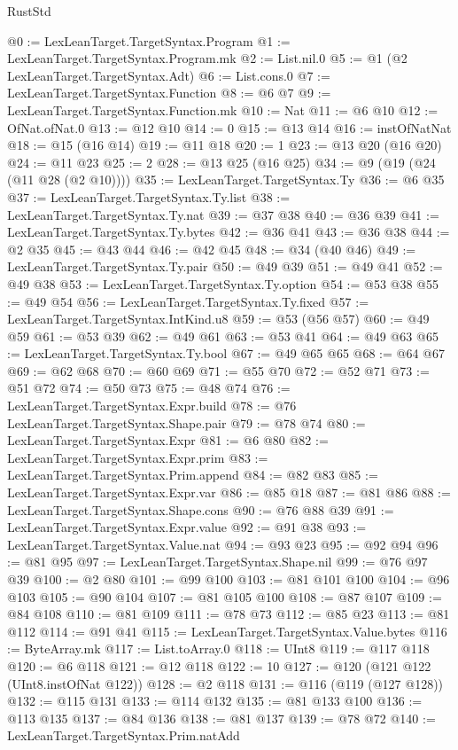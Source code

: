 \begin{lexlean}{RustStd}
\begin{coremodule}
@0 := LexLeanTarget.TargetSyntax.Program
@1 := LexLeanTarget.TargetSyntax.Program.mk
@2 := List.nil.{0}
@5 := @1 (@2 LexLeanTarget.TargetSyntax.Adt)
@6 := List.cons.{0}
@7 := LexLeanTarget.TargetSyntax.Function
@8 := @6 @7
@9 := LexLeanTarget.TargetSyntax.Function.mk
@10 := Nat
@11 := @6 @10
@12 := OfNat.ofNat.{0}
@13 := @12 @10
@14 := 0
@15 := @13 @14
@16 := instOfNatNat
@18 := @15 (@16 @14)
@19 := @11 @18
@20 := 1
@23 := @13 @20 (@16 @20)
@24 := @11 @23
@25 := 2
@28 := @13 @25 (@16 @25)
@34 := @9 (@19 (@24 (@11 @28 (@2 @10))))
@35 := LexLeanTarget.TargetSyntax.Ty
@36 := @6 @35
@37 := LexLeanTarget.TargetSyntax.Ty.list
@38 := LexLeanTarget.TargetSyntax.Ty.nat
@39 := @37 @38
@40 := @36 @39
@41 := LexLeanTarget.TargetSyntax.Ty.bytes
@42 := @36 @41
@43 := @36 @38
@44 := @2 @35
@45 := @43 @44
@46 := @42 @45
@48 := @34 (@40 @46)
@49 := LexLeanTarget.TargetSyntax.Ty.pair
@50 := @49 @39
@51 := @49 @41
@52 := @49 @38
@53 := LexLeanTarget.TargetSyntax.Ty.option
@54 := @53 @38
@55 := @49 @54
@56 := LexLeanTarget.TargetSyntax.Ty.fixed
@57 := LexLeanTarget.TargetSyntax.IntKind.u8
@59 := @53 (@56 @57)
@60 := @49 @59
@61 := @53 @39
@62 := @49 @61
@63 := @53 @41
@64 := @49 @63
@65 := LexLeanTarget.TargetSyntax.Ty.bool
@67 := @49 @65 @65
@68 := @64 @67
@69 := @62 @68
@70 := @60 @69
@71 := @55 @70
@72 := @52 @71
@73 := @51 @72
@74 := @50 @73
@75 := @48 @74
@76 := LexLeanTarget.TargetSyntax.Expr.build
@78 := @76 LexLeanTarget.TargetSyntax.Shape.pair
@79 := @78 @74
@80 := LexLeanTarget.TargetSyntax.Expr
@81 := @6 @80
@82 := LexLeanTarget.TargetSyntax.Expr.prim
@83 := LexLeanTarget.TargetSyntax.Prim.append
@84 := @82 @83
@85 := LexLeanTarget.TargetSyntax.Expr.var
@86 := @85 @18
@87 := @81 @86
@88 := LexLeanTarget.TargetSyntax.Shape.cons
@90 := @76 @88 @39
@91 := LexLeanTarget.TargetSyntax.Expr.value
@92 := @91 @38
@93 := LexLeanTarget.TargetSyntax.Value.nat
@94 := @93 @23
@95 := @92 @94
@96 := @81 @95
@97 := LexLeanTarget.TargetSyntax.Shape.nil
@99 := @76 @97 @39
@100 := @2 @80
@101 := @99 @100
@103 := @81 @101 @100
@104 := @96 @103
@105 := @90 @104
@107 := @81 @105 @100
@108 := @87 @107
@109 := @84 @108
@110 := @81 @109
@111 := @78 @73
@112 := @85 @23
@113 := @81 @112
@114 := @91 @41
@115 := LexLeanTarget.TargetSyntax.Value.bytes
@116 := ByteArray.mk
@117 := List.toArray.{0}
@118 := UInt8
@119 := @117 @118
@120 := @6 @118
@121 := @12 @118
@122 := 10
@127 := @120 (@121 @122 (UInt8.instOfNat @122))
@128 := @2 @118
@131 := @116 (@119 (@127 @128))
@132 := @115 @131
@133 := @114 @132
@135 := @81 @133 @100
@136 := @113 @135
@137 := @84 @136
@138 := @81 @137
@139 := @78 @72
@140 := LexLeanTarget.TargetSyntax.Prim.natAdd

\end{coremodule}
\end{lexlean}
